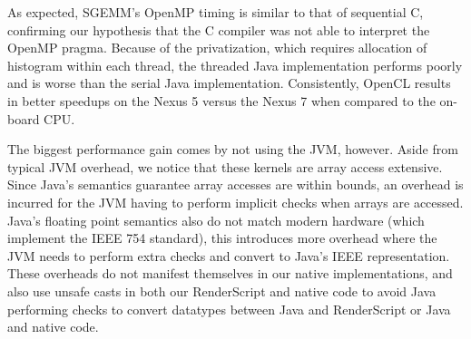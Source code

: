 As expected, SGEMM's OpenMP timing is similar to that of sequential C, confirming our hypothesis that the C compiler was not able
  to interpret the OpenMP pragma.
Because of the privatization, which requires allocation of histogram within each thread, the threaded Java implementation performs poorly and is 
  worse than the serial Java implementation.
Consistently, OpenCL results in better speedups on the Nexus 5 versus the Nexus 7 when compared to the on-board CPU. 

The biggest performance gain comes by not using the JVM, however.
Aside from typical JVM overhead, we notice that these kernels are array access extensive.
Since Java's semantics guarantee array accesses are within bounds, an overhead is incurred for the JVM having to perform implicit checks when arrays are accessed.
Java's floating point semantics also do not match modern hardware (which implement the IEEE 754 standard),
  this introduces more overhead where the JVM needs to perform extra checks and
  convert to Java's IEEE representation.
These overheads do not manifest themselves in our native implementations, and
  also use unsafe casts in both our RenderScript and native code
  to avoid Java performing checks to convert datatypes between Java and RenderScript or Java and native code.

